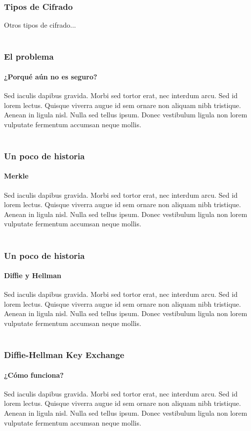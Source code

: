 \documentclass[spanish, mexico]{beamer}
\begin{document}
	\begin{frame}
		\frametitle{Tipos de Cifrado}
		 Otros tipos de cifrado...\\~\\
	\end{frame}

	\begin{frame}
		\frametitle{El problema}
		\framesubtitle{¿Porqué aún no es seguro?}
		Sed iaculis dapibus gravida. Morbi sed tortor erat, nec interdum arcu. Sed id lorem lectus. Quisque viverra augue id sem ornare non aliquam nibh tristique. Aenean in ligula nisl. Nulla sed tellus ipsum. Donec vestibulum ligula non lorem vulputate fermentum accumsan neque mollis.\\~\\
	\end{frame}

	\begin{frame}
		\frametitle{Un poco de historia}
		\framesubtitle{Merkle}
		Sed iaculis dapibus gravida. Morbi sed tortor erat, nec interdum arcu. Sed id lorem lectus. Quisque viverra augue id sem ornare non aliquam nibh tristique. Aenean in ligula nisl. Nulla sed tellus ipsum. Donec vestibulum ligula non lorem vulputate fermentum accumsan neque mollis.\\~\\
	\end{frame}

	\begin{frame}
		\frametitle{Un poco de historia}
		\framesubtitle{Diffie y Hellman}
		Sed iaculis dapibus gravida. Morbi sed tortor erat, nec interdum arcu. Sed id lorem lectus. Quisque viverra augue id sem ornare non aliquam nibh tristique. Aenean in ligula nisl. Nulla sed tellus ipsum. Donec vestibulum ligula non lorem vulputate fermentum accumsan neque mollis.\\~\\
	\end{frame}

	\begin{frame}
		\frametitle{Diffie-Hellman Key Exchange}
		\framesubtitle{¿Cómo funciona?}
		Sed iaculis dapibus gravida. Morbi sed tortor erat, nec interdum arcu. Sed id lorem lectus. Quisque viverra augue id sem ornare non aliquam nibh tristique. Aenean in ligula nisl. Nulla sed tellus ipsum. Donec vestibulum ligula non lorem vulputate fermentum accumsan neque mollis.\\~\\
	\end{frame}
\end{document}
